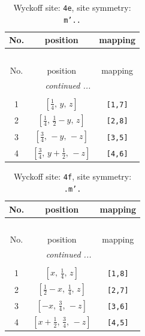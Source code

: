 \documentclass[fleqn,8pt]{jsarticle}
\begin{document}
\renewcommand{\arraystretch}{1.2}
\begin{longtable}{ccc}
\caption{Wyckoff site: {\tt 4e}, site symmetry: {\tt m'..}}
 \\
 \hline \hline
No. & position & mapping \\ \hline \endfirsthead

\multicolumn{2}{l}{\tablename\ \thetable{}} \\
 \hline \hline
No. & position & mapping \\ \hline \endhead

 \hline \hline
\multicolumn{2}{r}{\footnotesize\it continued ...} \\ \endfoot

 \hline \hline
\multicolumn{2}{r}{} \\ \endlastfoot

1 & $\left[ \frac{1}{4},\, y,\, z \right]$ & {\tt [1,7]} \\ \hline
2 & $\left[ \frac{1}{4},\, \frac{1}{2} - y,\, z \right]$ & {\tt [2,8]} \\ \hline
3 & $\left[ \frac{3}{4},\, - y,\, - z \right]$ & {\tt [3,5]} \\ \hline
4 & $\left[ \frac{3}{4},\, y + \frac{1}{2},\, - z \right]$ & {\tt [4,6]} \\
\end{longtable}
\renewcommand{\arraystretch}{1.2}
\begin{longtable}{ccc}
\caption{Wyckoff site: {\tt 4f}, site symmetry: {\tt .m'.}}
 \\
 \hline \hline
No. & position & mapping \\ \hline \endfirsthead

\multicolumn{2}{l}{\tablename\ \thetable{}} \\
 \hline \hline
No. & position & mapping \\ \hline \endhead

 \hline \hline
\multicolumn{2}{r}{\footnotesize\it continued ...} \\ \endfoot

 \hline \hline
\multicolumn{2}{r}{} \\ \endlastfoot

1 & $\left[ x,\, \frac{1}{4},\, z \right]$ & {\tt [1,8]} \\ \hline
2 & $\left[ \frac{1}{2} - x,\, \frac{1}{4},\, z \right]$ & {\tt [2,7]} \\ \hline
3 & $\left[ - x,\, \frac{3}{4},\, - z \right]$ & {\tt [3,6]} \\ \hline
4 & $\left[ x + \frac{1}{2},\, \frac{3}{4},\, - z \right]$ & {\tt [4,5]} \\
\end{longtable}
\end{document}
